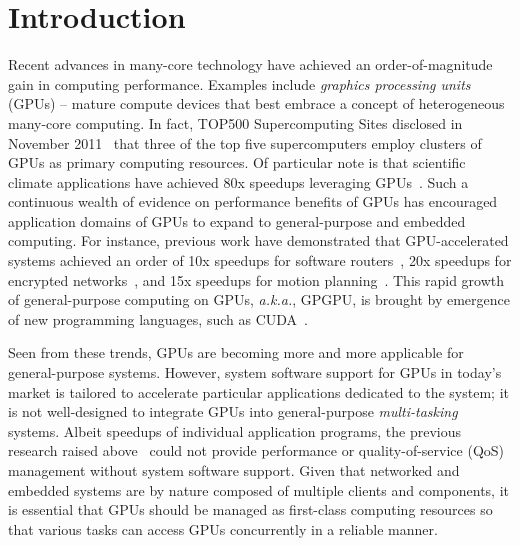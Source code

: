 \vspace{-0.25em}
\section{Introduction}
\label{sec:introduction}
\vspace{-0.25em}

Recent advances in many-core technology have achieved an
order-of-magnitude gain in computing performance.
Examples include \textit{graphics processing units} (GPUs) -- mature
compute devices that best embrace a concept of heterogeneous many-core
computing.
In fact, TOP500 Supercomputing Sites disclosed in November
2011~\cite{TOP500} that three of the top five supercomputers employ
clusters of GPUs as primary computing resources.
Of particular note is that scientific climate applications have achieved
80x speedups leveraging GPUs~\cite{Shimokawabe10}.
Such a continuous wealth of evidence on performance benefits of GPUs has
encouraged application domains of GPUs to expand to general-purpose and
embedded computing.
For instance, previous work have demonstrated that GPU-accelerated
systems achieved an order of 10x speedups for software
routers~\cite{Han_SIGCOMM10}, 20x speedups for encrypted
networks~\cite{Jang_NSDI11}, and 15x speedups for motion
planning~\cite{McNaughton_ICRA11}.
This rapid growth of general-purpose computing on GPUs,
\textit{a.k.a.}, GPGPU, is brought by emergence of new programming
languages, such as CUDA~\cite{CUDA40}.

Seen from these trends, GPUs are becoming more and more applicable for
general-purpose systems.
However, system software support for GPUs in today's market is
tailored to accelerate particular applications dedicated to the
system; it is not well-designed to integrate GPUs into general-purpose
\textit{multi-tasking} systems.
Albeit speedups of individual application programs, the previous
research raised above~\cite{Han_SIGCOMM10, Jang_NSDI11,
McNaughton_ICRA11} could not provide performance or quality-of-service
(QoS) management without system software support.
Given that networked and embedded systems are by nature composed
of multiple clients and components, it is essential that GPUs should be
managed as first-class computing resources so that various tasks can
access GPUs concurrently in a reliable manner.

